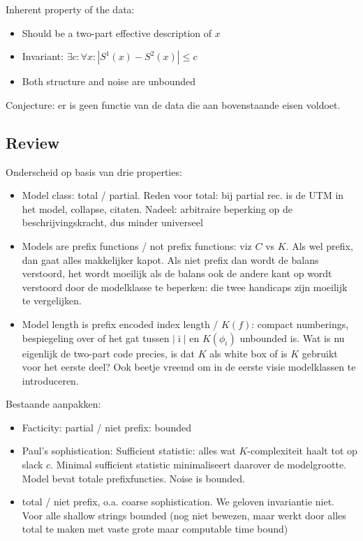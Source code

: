 \documentclass{style/llncs}
\begin{document}
Inherent property of the data: 
\begin{itemize}
\item Should be a two-part effective description of $x$
\item Invariant: $\exists c:\forall x:|S^1(x)-S^2(x)|\le c$
\item Both structure and noise are unbounded
\end{itemize}

Conjecture: er is geen functie van de data die aan bovenstaande eisen voldoet.



\subsection{Review}
Onderscheid op basis van drie properties:
\begin{itemize}
\item Model class: total / partial. Reden voor total: bij partial rec. is de UTM in het model, collapse, citaten. Nadeel: arbitraire beperking op de beschrijvingskracht, dus minder universeel
\item Models are prefix functions / not prefix functions: viz $C$ vs $K$. Als wel prefix, dan gaat alles makkelijker kapot. Als niet prefix dan wordt de balans verstoord, het wordt moeilijk als de balans ook de andere kant op wordt verstoord door de modelklasse te beperken: die twee handicaps zijn moeilijk te vergelijken.
\item Model length is prefix encoded index length / $K(f)$: compact numberings, bespiegeling over of het gat tussen $|\bar\imath|$ en $K(\phi_i)$ unbounded is. Wat is nu eigenlijk de two-part code precies, is dat $K$ als white box of is $K$ gebruikt voor het eerste deel? Ook beetje vreemd om in de eerste visie modelklassen te introduceren.
\end{itemize}

Bestaande aanpakken:
\begin{itemize}

\item Facticity: partial / niet prefix: bounded

\item Paul's sophistication: Sufficient statistic: alles wat $K$-complexiteit haalt tot op slack $c$. Minimal sufficient statistic minimaliseert daarover de modelgrootte. Model bevat totale prefixfuncties. Noise is bounded.

\item total / niet prefix, o.a. coarse sophistication. We geloven invariantie niet. Voor alle shallow strings bounded (nog niet bewezen, maar werkt door alles total te maken met vaste grote maar computable time bound)

\end{itemize}
\end{document}
